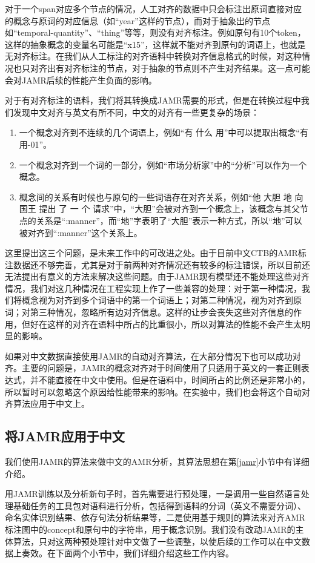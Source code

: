 \documentclass[master, winfont]{njuthesis}
\begin{document}
对于一个span对应多个节点的情况，人工对齐的数据中只会标注出原词直接对应的概念与原词的对应信息（如“year”这样的节点），而对于抽象出的节点如“temporal-quantity”、“thing”等等，则没有对齐标注。例如原句有10个token，这样的抽象概念的变量名可能是“x15”，这样就不能对齐到原句的词语上，也就是无对齐标注。在我们从人工标注的对齐语料中转换对齐信息格式的时候，对这种情况也只对齐出有对齐标注的节点，对于抽象的节点则不产生对齐结果。这一点可能会对JAMR后续的性能产生负面的影响。

对于有对齐标注的语料，我们将其转换成JAMR需要的形式，但是在转换过程中我们发现中文对齐与英文有所不同，中文的对齐有一些更复杂的场景：

\begin{enumerate}
	\item 一个概念对齐到不连续的几个词语上，例如“有 什么 用”中可以提取出概念“有用-01”。
	\item 一个概念对齐到一个词的一部分，例如“市场分析家”中的“分析”可以作为一个概念。
	\item 概念间的关系有时候也与原句的一些词语存在对齐关系，例如“他 大胆 地 向 国王 提出 了 一 个 请求”中，“大胆”会被对齐到一个概念上，该概念与其父节点的关系是“:manner”，而“地”字表明了“大胆”表示一种方式，所以“地”可以被对齐到“:manner”这个关系上。
\end{enumerate}

这里提出这三个问题，是未来工作中的可改进之处。由于目前中文CTB的AMR标注数据还不够完善，尤其是对于前两种对齐情况还有较多的标注错误，所以目前还无法提出有意义的方法来解决这些问题。由于JAMR现有模型还不能处理这些对齐情况，我们对这几种情况在工程实现上作了一些兼容的处理：对于第一种情况，我们将概念视为对齐到多个词语中的第一个词语上；对第二种情况，视为对齐到原词；对第三种情况，忽略所有边对齐信息。这样的让步会丧失这些对齐信息的作用，但好在这样的对齐在语料中所占的比重很小，所以对算法的性能不会产生太明显的影响。

如果对中文数据直接使用JAMR的自动对齐算法，在大部分情况下也可以成功对齐。主要的问题是，JAMR的概念对齐对于时间使用了只适用于英文的一套正则表达式，并不能直接在中文中使用。但是在语料中，时间所占的比例还是非常小的，所以暂时可以忽略这个原因给性能带来的影响。在实验中，我们也会将这个自动对齐算法应用于中文上。

\subsection{将JAMR应用于中文}
我们使用JAMR的算法来做中文的AMR分析，其算法思想在第\ref{jamr}小节中有详细介绍。

用JAMR训练以及分析新句子时，首先需要进行预处理，一是调用一些自然语言处理基础任务的工具包对语料进行分析，包括得到语料的分词（英文不需要分词）、命名实体识别结果、依存句法分析结果等，二是使用基于规则的算法来对齐AMR标注图中的concept和原句中的字符串，用于概念识别。我们没有改动JAMR的主体算法，只对这两种预处理针对中文做了一些调整，以使后续的工作可以在中文数据上奏效。在下面两个小节中，我们详细介绍这些工作内容。
\end{document}
